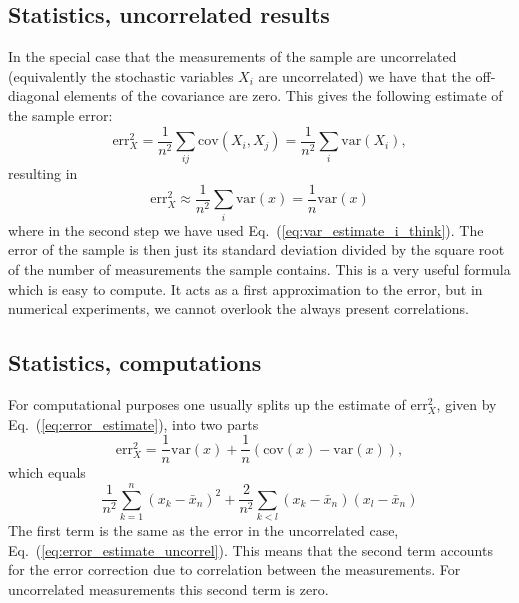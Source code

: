 \documentclass[%
oneside,                 %
final,                   %
10pt]{article}
\begin{document}
\subsection{Statistics, uncorrelated results}
\begin{block}{}

In the special case that the measurements of the sample are
uncorrelated (equivalently the stochastic variables $X_i$ are
uncorrelated) we have that the off-diagonal elements of the covariance
are zero. This gives the following estimate of the sample error:
\[
\mathrm{err}_X^2=\frac{1}{n^2}\sum_{ij} \mathrm{cov}(X_i, X_j) =
\frac{1}{n^2} \sum_i \mathrm{var}(X_i),
\]
resulting in
\begin{equation}
\mathrm{err}_X^2\approx \frac{1}{n^2} \sum_i \mathrm{var}(x)= \frac{1}{n}\mathrm{var}(x)
\label{eq:error_estimate_uncorrel}
\end{equation}
where in the second step we have used Eq.~(\ref{eq:var_estimate_i_think}).
The error of the sample is then just its standard deviation divided by
the square root of the number of measurements the sample contains.
This is a very useful formula which is easy to compute. It acts as a
first approximation to the error, but in numerical experiments, we
cannot overlook the always present correlations.
\end{block}

\subsection{Statistics, computations}
\begin{block}{}
For computational purposes one usually splits up the estimate of
$\mathrm{err}_X^2$, given by Eq.~(\ref{eq:error_estimate}), into two
parts
\[
\mathrm{err}_X^2 = \frac{1}{n}\mathrm{var}(x) + \frac{1}{n}(\mathrm{cov}(x)-\mathrm{var}(x)),
\]
which equals
\begin{equation}
\frac{1}{n^2}\sum_{k=1}^n (x_k - \bar x_n)^2 +\frac{2}{n^2}\sum_{k<l} (x_k - \bar x_n)(x_l - \bar x_n)
\label{eq:error_estimate_split_up}
\end{equation}
The first term is the same as the error in the uncorrelated case,
Eq.~(\ref{eq:error_estimate_uncorrel}). This means that the second
term accounts for the error correction due to correlation between the
measurements. For uncorrelated measurements this second term is zero.
\end{block}

\end{document}
